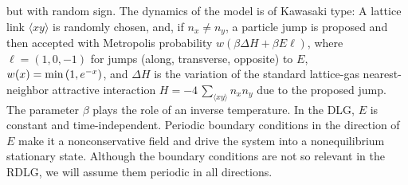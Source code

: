 \documentclass[aps,prl,twocolumn,floatfix,amssymb,showpacs]{revtex4}
\begin{document}
  but with random sign. The dynamics of the model is of Kawasaki type:
  A lattice link $\langle xy\rangle$ is randomly chosen, and, if
  $n_{x}\not= n_y$, a particle jump is proposed and then accepted with
  Metropolis probability $w(\beta \Delta H + \beta E \ell)$, where $\ell
  = (1,0,-1)$ for jumps (along, transverse, opposite) to $E$, $w(x) =
  \hbox{\rm min}\, (1,e^{-x})$, and $\Delta H$ is the variation 
  of the standard lattice-gas nearest-neighbor
  attractive interaction 
  $H = - 4\,\sum_{\langle xy\rangle} n_x n_y$ due to
  the proposed jump.
  The parameter $\beta$ plays the role of an inverse
  temperature. 
  In the DLG, $E$ is constant and time-independent. 
  Periodic boundary conditions in the direction of $E$ make it a
  nonconservative field and drive the system into a nonequilibrium stationary
  state. Although the boundary conditions are not so relevant in the
  RDLG, we will assume them periodic in all directions.
   
\end{document}
